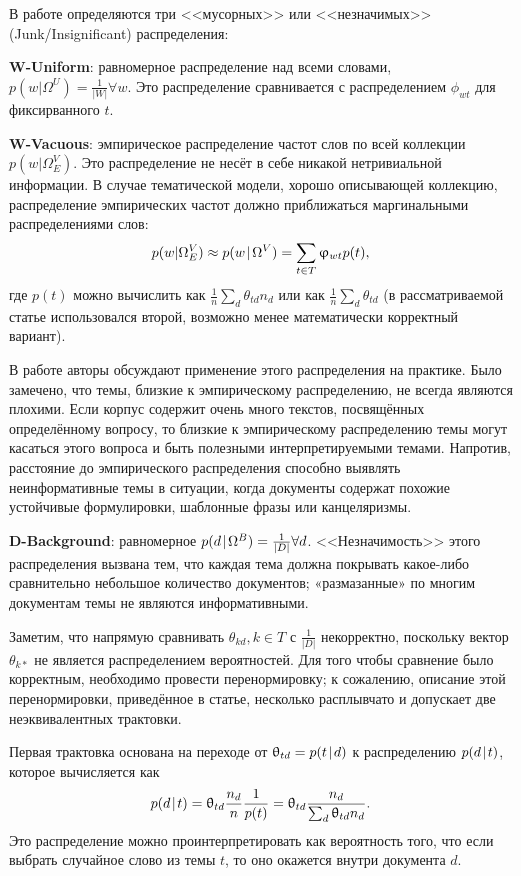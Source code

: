 В работе \cite{alsumait2009topic} определяются три <<мусорных>> или <<незначимых>> (Junk/Insignificant) распределения:

\textbf{W-Uniform}: равномерное распределение над всеми словами, $p(w|\Omega^U) = \frac{1}{|W|} \forall w$. Это распределение сравнивается с распределением $\phi_{wt}$ для фиксирванного $t$.

\textbf{W-Vacuous}: эмпирическое распределение частот слов по всей коллекции $p(w|\Omega^V_E)$. Это распределение не несёт в себе никакой нетривиальной информации. В случае тематической модели, хорошо описывающей коллекцию, распределение эмпирических частот должно приближаться маргинальными распределениями слов:
$$
    p(w|\Omega^V_E) \approx p(w\mspace{2mu}{|}\mspace{2mu} \Omega^V) = \sum_{t \in T} \upvarphi_{wt}p(t),
$$
где $p(t)$ можно вычислить как $\frac{1}{n}\sum_d \theta_{td} n_d$ или как $\frac{1}{n}\sum_d \theta_{td}$ (в рассматриваемой статье использовался второй, возможно менее математически корректный вариант).

В работе \cite{boydcare} авторы обсуждают применение этого распределения на практике. Было замечено, что темы, близкие к эмпирическому распределению, не всегда являются плохими. Если корпус содержит очень много текстов, посвящённых определённому вопросу, то близкие к эмпирическому распределению темы могут касаться этого вопроса и быть полезными интерпретируемыми темами. Напротив, расстояние до эмпирического распределения способно выявлять неинформативные темы в ситуации, когда документы содержат похожие устойчивые формулировки, шаблонные фразы или канцеляризмы.

\textbf{D-Background}: равномерное $p(d\mspace{2mu}{|}\mspace{2mu} \Omega^B) = \frac{1}{|D|} \forall d$. <<Незначимость>> этого распределения вызвана тем, что каждая тема должна покрывать какое-либо сравнительно небольшое количество документов; «размазанные» по многим документам темы не являются информативными.

Заметим, что напрямую сравнивать $\theta_{k d}, k \in T$ с $\frac{1}{|D|}$ некорректно, поскольку вектор $\theta_{k \ast}$ не является распределением вероятностей. Для того чтобы сравнение было корректным, необходимо провести перенормировку; к сожалению, описание этой перенормировки, приведённое в статье, несколько расплывчато и допускает две неэквивалентных трактовки.

Первая трактовка основана на переходе от $\uptheta_{td} = p(t\mspace{2mu}{|}\mspace{2mu} d)$ к распределению $p(d\mspace{2mu}{|}\mspace{2mu} t)$, которое вычисляется как
$$
    p(d\mspace{2mu}{|}\mspace{2mu} t) = \uptheta_{td} \frac{n_d}{n} \frac{1}{p(t)} = \uptheta_{td} \frac{n_d}{\sum_d \uptheta_{td} n_d}.
$$
Это распределение можно проинтерпретировать как вероятность того, что если выбрать случайное слово из темы $t$, то оно окажется внутри документа $d$.

